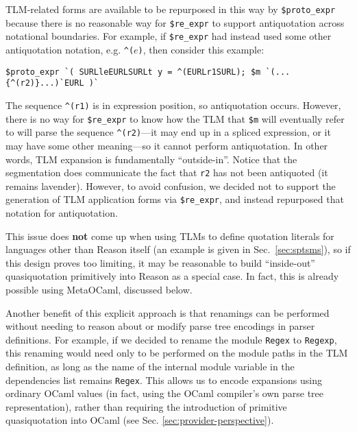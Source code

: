 \documentclass[acmsmall]{acmart}
\newcommand{\li}[1]{\lstinline[basicstyle=\ttfamily\fontsize{9pt}{1em}\selectfont]{#1}}
\begin{document}
TLM-related forms are available to be repurposed in this way by \li{$proto_expr} because there is no reasonable way for \li{$re_expr} to support antiquotation across notational boundaries. For example, if \li{$re_expr} had instead used some other antiquotation notation, e.g. \li{^(}$e$\li{)}, then consider this example:
\begin{lstlisting}[numbers=none]
  $proto_expr `( SURLleEURLSURLt y = ^(EURLr1SURL); $m `(...{^(r2)}...)`EURL )`
\end{lstlisting}
The sequence \li{^(r1)} is in expression position, so antiquotation occurs. However, there is no way for \li{$re_expr} to know how the TLM that \li{$m} will eventually refer to will parse the sequence \li{^(r2)}---it may end up in a spliced expression, or it may have some other meaning---so it cannot perform antiquotation. In other words, TLM expansion is fundamentally ``outside-in''.  Notice that the segmentation does communicate the fact that \li{r2} has not been antiquoted (it remains lavender). However, to avoid confusion, we decided not to support the generation of TLM application forms via \li{$re_expr}, and instead repurposed that notation for antiquotation. 

This issue does \textbf{not} come up when using TLMs to define quotation literals for languages other than Reason itself (an example is given in Sec.~\ref{sec:sptsms}), so if this design proves too limiting, it may be reasonable to build ``inside-out'' quasiquotation primitively into Reason as a special case. In fact, this is already possible using MetaOCaml, discussed below. %

 Another benefit of this explicit approach is that renamings can be performed without needing to reason about or modify parse tree encodings in parser definitions. For example, if we decided to rename the module \li{Regex} to \li{Regexp}, this renaming would need only to be performed on the module paths in the TLM definition, as long as the name of the internal module variable in the dependencies list remains \li{Regex}. 
This allows us to encode expansions using ordinary OCaml values (in fact, using the OCaml compiler's own parse tree representation), rather than requiring the introduction of primitive quasiquotation into OCaml (see Sec. \ref{sec:provider-perspective}).
\end{document}
